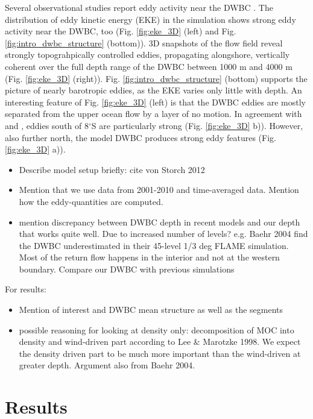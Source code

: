 \documentclass{ametsoc}
\begin{document}
Several observational studies report eddy activity near the DWBC \citep{Lee1996, Schott2002,Dengler2004,Schott2005}. The distribution of eddy kinetic energy (EKE) in the simulation shows strong eddy activity near the DWBC, too (Fig. \ref{fig:eke_3D} (left) and Fig. \ref{fig:intro_dwbc_structure} (bottom)). 3D snapshots of the flow field reveal strongly topograhpically controlled eddies, propagating alongshore, vertically coherent over the full depth range of the DWBC between 1000 m and 4000 m (Fig. \ref{fig:eke_3D} (right)). Fig. \ref{fig:intro_dwbc_structure} (bottom) supports the picture of nearly barotropic eddies, as the EKE varies only little with depth. An interesting feature of Fig. \ref{fig:eke_3D} (left) is that the DWBC eddies are mostly separated from the upper ocean flow by a layer of no motion. In agreement with \citet{Dengler2004} and \cite{Schott2005}, eddies south of 8$^\circ$S are particularly strong (Fig. \ref{fig:eke_3D} b)). However, also further north, the model DWBC produces strong eddy features (Fig. \ref{fig:eke_3D} a)). \\

\begin{itemize}
\item Describe model setup briefly: cite von Storch 2012
\item Mention that we use data from 2001-2010 and time-averaged data. Mention how the eddy-quantities are computed.\\ 
\item mention discrepancy between DWBC depth in recent models and our depth that works quite well. Due to increased number of levels? e.g. Baehr 2004 find the DWBC underestimated in their 45-level 1/3 deg FLAME simulation. Most of the return flow happens in the interior and not at the western boundary. Compare our DWBC with previous simulations
\end{itemize}
For results:
\begin{itemize}
\item Mention of interest and DWBC mean structure as well as the segments
\item possible reasoning for looking at density only: decomposition of MOC into density and wind-driven part according to Lee \& Marotzke 1998. We expect the density driven part to be much more important than the wind-driven at greater depth. Argument also from Baehr 2004.
\end{itemize}
\section{Results}
\end{document}
